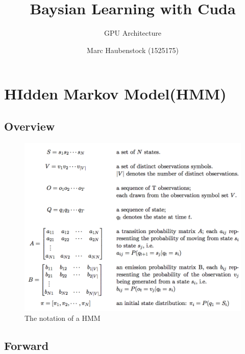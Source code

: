 \documentclass[english, paper=a4]{scrartcl}
\begin{document}
\graphicspath{{images/}}


\title{Baysian Learning with Cuda} 

\subtitle{GPU Architecture} 

\author{Marc Haubenstock (1525175)}




\maketitle

\section{HIdden Markov Model(HMM)}

\subsection{Overview}

\begin{figure}[H]
\centering

\includegraphics[scale=0.3]{"symbols"}
  \caption{The notation of a HMM \cite{cuhmm}}
\end{figure}


\subsection{Forward}
\end{document}
